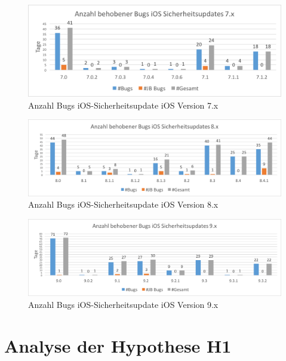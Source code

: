 \begin{figure}[htbp]
        \centering
                \includegraphics[scale=0.7]{Bilder/iOSSicherheitsupdate7.png}
        \caption{Anzahl Bugs iOS-Sicherheitsupdate iOS Version 7.x}
        \label{fig:AnalyseiOSSicherheitsupdate7}
\end{figure}

\begin{figure}[htbp]
        \centering
                \includegraphics[scale=0.6]{Bilder/iOSSicherheitsupdate8.png}
        \caption{Anzahl Bugs iOS-Sicherheitsupdate iOS Version 8.x}
        \label{fig:AnalyseiOSSicherheitsupdate8}
\end{figure}

\begin{figure}[htbp]
        \centering
                \includegraphics[scale=0.55]{Bilder/iOSSicherheitsupdate9.png}
        \caption{Anzahl Bugs iOS-Sicherheitsupdate iOS Version 9.x}
        \label{fig:AnalyseiOSSicherheitsupdate9}
\end{figure}

\newpage
\section{Analyse der Hypothese H1}
\label{sec:AnalyseHypo}




 
